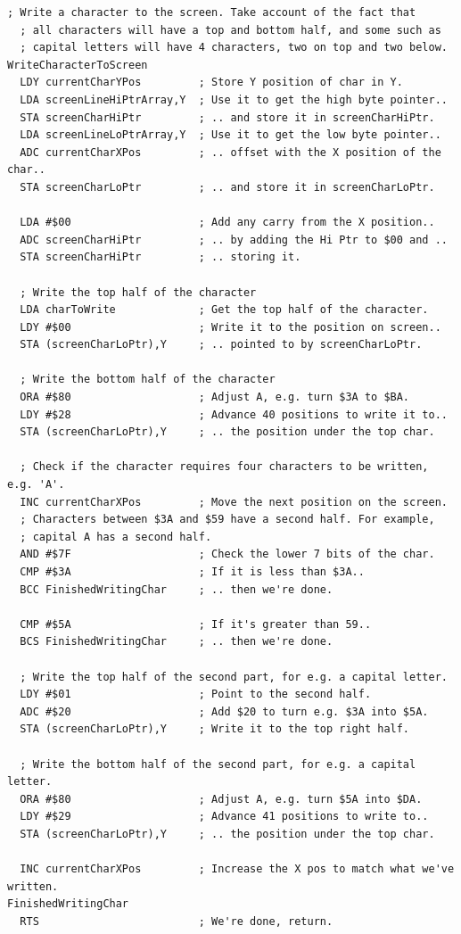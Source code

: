 \clearpage
\begin{lstlisting}[basicstyle=\scriptsize\ttfamily, escapechar=\%]
  ; Write a character to the screen. Take account of the fact that
  ; all characters will have a top and bottom half, and some such as
  ; capital letters will have 4 characters, two on top and two below.
WriteCharacterToScreen
  LDY currentCharYPos         ; Store Y position of char in Y.
  LDA screenLineHiPtrArray,Y  ; Use it to get the high byte pointer..
  STA screenCharHiPtr         ; .. and store it in screenCharHiPtr.
  LDA screenLineLoPtrArray,Y  ; Use it to get the low byte pointer..
  ADC currentCharXPos         ; .. offset with the X position of the char..
  STA screenCharLoPtr         ; .. and store it in screenCharLoPtr.

  LDA #$00                    ; Add any carry from the X position..
  ADC screenCharHiPtr         ; .. by adding the Hi Ptr to $00 and ..
  STA screenCharHiPtr         ; .. storing it.

  ; Write the top half of the character
  LDA charToWrite             ; Get the top half of the character.
  LDY #$00                    ; Write it to the position on screen..
  STA (screenCharLoPtr),Y     ; .. pointed to by screenCharLoPtr.

  ; Write the bottom half of the character
  ORA #$80                    ; Adjust A, e.g. turn $3A to $BA.
  LDY #$28                    ; Advance 40 positions to write it to..
  STA (screenCharLoPtr),Y     ; .. the position under the top char.

  ; Check if the character requires four characters to be written, e.g. 'A'.
  INC currentCharXPos         ; Move the next position on the screen.
  ; Characters between $3A and $59 have a second half. For example,
  ; capital A has a second half.
  AND #$7F                    ; Check the lower 7 bits of the char.
  CMP #$3A                    ; If it is less than $3A..
  BCC FinishedWritingChar     ; .. then we're done.

  CMP #$5A                    ; If it's greater than 59..
  BCS FinishedWritingChar     ; .. then we're done.

  ; Write the top half of the second part, for e.g. a capital letter.
  LDY #$01                    ; Point to the second half.
  ADC #$20                    ; Add $20 to turn e.g. $3A into $5A.
  STA (screenCharLoPtr),Y     ; Write it to the top right half.

  ; Write the bottom half of the second part, for e.g. a capital letter.
  ORA #$80                    ; Adjust A, e.g. turn $5A into $DA. 
  LDY #$29                    ; Advance 41 positions to write to..
  STA (screenCharLoPtr),Y     ; .. the position under the top char.

  INC currentCharXPos         ; Increase the X pos to match what we've written.
FinishedWritingChar   
  RTS                         ; We're done, return.
\end{lstlisting}

